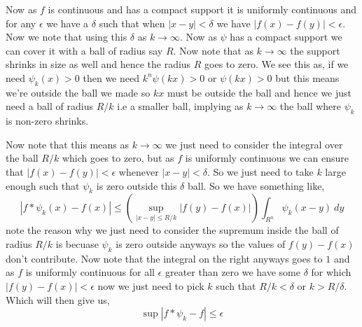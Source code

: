 \documentclass[a4paper]{article}
\begin{document}
Now as $f$ is continuous and has a compact support it is uniformly continuous  and for any $\epsilon$ we have a $\delta$ such that when $|x - y| < \delta$ we have $|f(x) - f(y)| < \epsilon$. Now we note that using this $\delta$ as $k \to \infty$. Now as $\psi$ has a compact support we can cover it with a ball of radius say $R$. Now note that as $k \to \infty$ the support shrinks in size as well and hence the radius $R$ goes to zero. We see this as, if we need $\psi_k(x) > 0$ then we need $k^{n} \psi(kx) > 0$ or $\psi(kx)  > 0$ but this means we're outside the ball we made so $kx$ must be outside the ball and hence we just need a ball of radius $R / k$ i.e a smaller ball, implying as $k \to \infty$ the ball where $\psi_k$ is non-zero shrinks. 

\vspace{1em}

Now note that this means as $k \to \infty$ we just need to consider the integral over the ball $R / k$ which goes to zero, but as $f$ is uniformly continuous we can ensure that $|f(x) - f(y)| < \epsilon$ whenever $ |x- y| < \delta$. So we just need to take $k$ large enough such that $\psi_k$ is zero outside this $\delta$ ball. So we have something like, 
\[
  |f * \psi_k(x) - f(x)| \le \left ( \sup_{|x - y| \le R / k} |f(y ) - f(x)|\right ) \int_{R^{n}}^{}  \psi_k(x - y) \ dy
\]
note the reason why we just need to consider the supremum inside the ball of radius $R / k$ is becuase $\psi_k$ is zero outside anyways so the values of $f(y) - f(x)$ don't contribute. Now note that the integral on the right anyways goes to $1$ and as $f$ is uniformly continuous for all $\epsilon$ greater than zero we have some $\delta$ for which $|f(y) - f(x)| < \epsilon$ now we just need to pick $k$ such that $R / k < \delta $ or $k > R / \delta$. Which will then give us, 
\[
  \sup | f * \psi_k - f| \le \epsilon
\]
\end{document}
